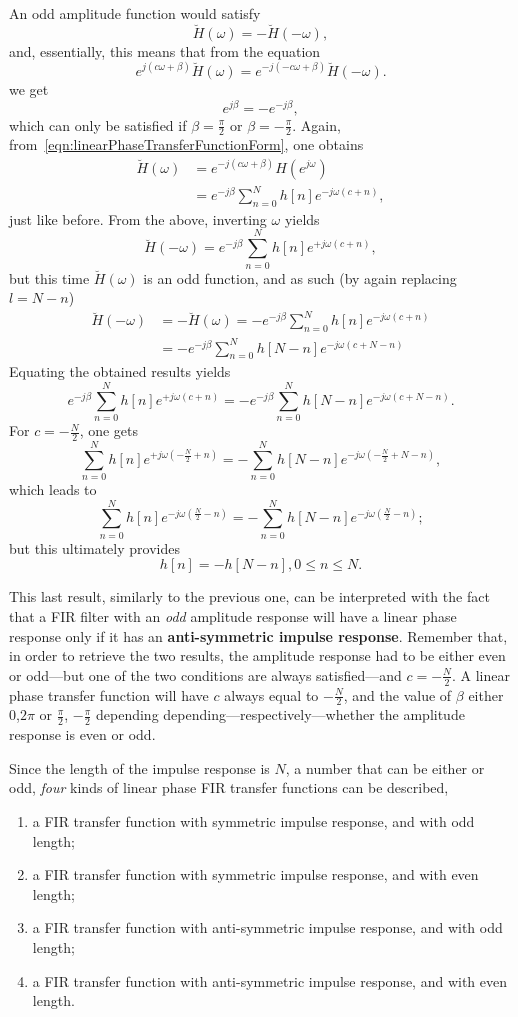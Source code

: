 \documentclass[\documentfontsize, twocolumn]{\classname}
\begin{document}
An odd amplitude function would satisfy
\[
    \breve{H}(\omega) = -\breve{H}(-\omega),
\]
and, essentially, this means that from the equation
\[
    e^{j(c\omega + \beta)}\breve{H}(\omega) = e^{-j(-c\omega + \beta)}\breve{H}(-\omega).
\]
we get
\[
    e^{j\beta} = -e^{-j\beta},
\]
which can only be satisfied if $\beta = \frac \pi 2$ or $\beta = -\frac \pi 2$. Again, from~\ref{eqn:linearPhaseTransferFunctionForm}, one obtains
\begin{align*}
    \breve{H}(\omega) &= e^{-j(c\omega + \beta)}H(e^{j\omega})\\
                      &= e^{-j\beta}\sum_{n=0}^N h[n]e^{-j\omega(c + n)},
\end{align*}
just like before. From the above, inverting $\omega$ yields
\[
    \breve{H}(-\omega) = e^{-j\beta}\sum_{n=0}^N h[n]e^{+j\omega(c + n)},
\]
but this time $\breve{H}(\omega)$ is an odd function, and as such (by again replacing $l = N - n$)
\begin{align*}
    \breve{H}(-\omega) &= -\breve{H}(\omega) = -e^{-j\beta}\sum_{n=0}^N h[n]e^{-j\omega(c + n)}\\
                       &=  -e^{-j\beta}\sum_{n=0}^N h[N - n]e^{-j\omega(c + N - n)}
\end{align*}
Equating the obtained results yields
\[
    e^{-j\beta}\sum_{n=0}^N h[n]e^{+j\omega(c + n)} = -e^{-j\beta}\sum_{n=0}^N h[N - n]e^{-j\omega(c + N - n)}.
\]
For $c = -\frac N 2$, one gets
\[
    \sum_{n=0}^N h[n]e^{+j\omega(-\frac N 2 + n)} = -\sum_{n=0}^N h[N - n]e^{-j\omega(-\frac N 2 + N - n)},
\]
which leads to
\[
    \sum_{n=0}^N h[n]e^{-j\omega(\frac N 2 - n)} = -\sum_{n=0}^N h[N - n]e^{-j\omega(\frac N 2 - n)};
\]
but this ultimately provides
\[
    h[n] = -h[N-n], 0 \leq n \leq N.
\]

This last result, similarly to the previous one, can be interpreted with the fact that a FIR filter with an \emph{odd} amplitude response will have a linear phase response only if it has an \textbf{anti-symmetric impulse response}. Remember that, in order to retrieve the two results, the amplitude response had to be either even or odd---but one of the two conditions are always satisfied---and $c=-\frac N 2$. A linear phase transfer function will have $c$ always equal to $-\frac N 2$, and the value of $\beta$ either $0$,$2\pi$ or $\frac \pi 2$, $-\frac \pi 2$ depending depending---respectively---whether the amplitude response is even or odd.

Since the length of the impulse response is $N$, a number that can be either or odd, \emph{four} kinds of linear phase FIR transfer functions can be described,
\begin{enumerate}
    \item a FIR transfer function with symmetric impulse response, and with odd length;
    \item a FIR transfer function with symmetric impulse response, and with even length;
    \item a FIR transfer function with anti-symmetric impulse response, and with odd length;
    \item a FIR transfer function with anti-symmetric impulse response, and with even length.
\end{enumerate}
\end{document}
